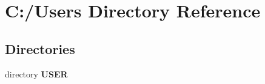 \section{C\+:/\+Users Directory Reference}
\label{dir_d522931ffa1371640980b621734a4381}
\subsection*{Directories}
\begin{DoxyCompactItemize}
\item 
directory \textbf{ U\+S\+ER}
\end{DoxyCompactItemize}
